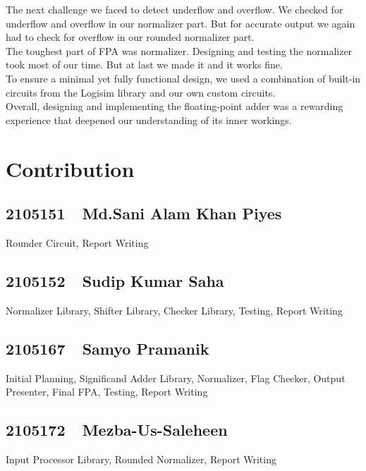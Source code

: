 \documentclass[a4paper,12pt]{article}
\begin{document}
The next challenge we faced to detect underflow and overflow. We checked for
underflow and overflow in our normalizer part. But for accurate output we again
had to check for overflow in our rounded normalizer part.\\

The toughest part of FPA was normalizer. Designing and testing the normalizer
took most of our time. But at last we made it and it works fine.\\

To ensure a minimal yet fully functional design, we used a combination of
built-in circuits from the Logisim library and our own custom circuits.\\

Overall, designing and implementing the floating-point adder was a rewarding
experience that deepened our understanding of its inner workings.

\section{Contribution}
\subsection*{2105151~~Md.Sani Alam Khan Piyes}
Rounder Circuit, Report Writing

\subsection*{2105152~~Sudip Kumar Saha}
Normalizer Library, Shifter Library, Checker Library, Testing, Report Writing

\subsection*{2105167~~Samyo Pramanik}
Initial Planning, Significand Adder Library, Normalizer, Flag Checker, Output
Presenter, Final FPA, Testing, Report Writing

\subsection*{2105172~~Mezba-Us-Saleheen}
Input Processor Library, Rounded Normalizer, Report Writing
\end{document}

